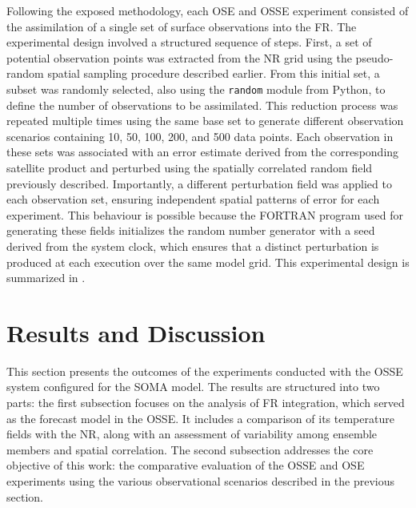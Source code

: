 Following the exposed methodology, each OSE and OSSE experiment consisted of the assimilation of a single set of surface observations into the FR. The experimental  design involved a structured sequence of steps. First, a set of potential observation points was extracted from the NR grid using the pseudo-random spatial sampling procedure described earlier. From this initial set, a subset was randomly selected, also using the \verb|random| module from Python, to define the number of observations to be assimilated. This reduction process was repeated multiple times using the same base set to generate different observation scenarios containing 10, 50, 100, 200, and 500 data points. Each observation in these sets was associated with an error estimate derived from the corresponding satellite product and perturbed using the spatially correlated random field previously described. Importantly, a different perturbation field was applied to each observation set, ensuring independent spatial patterns of error for each experiment. This behaviour is possible because the FORTRAN program used for generating these fields initializes the random number generator with a seed derived from the system clock, which ensures that a distinct perturbation is produced at each execution over the same model grid. This experimental design is summarized in .

\section{Results and Discussion} \label{sec:ossedesign_results}

This section presents the outcomes of the experiments conducted with the OSSE system configured for the SOMA model. The results are structured into two parts: the first subsection focuses on the analysis of FR integration, which served as the forecast model in the OSSE. It includes a comparison of its temperature fields with the NR, along with an assessment of variability among ensemble members and spatial correlation. The second subsection addresses the core objective of this work: the comparative evaluation of the OSSE and OSE experiments using the various observational scenarios described in the previous section.

